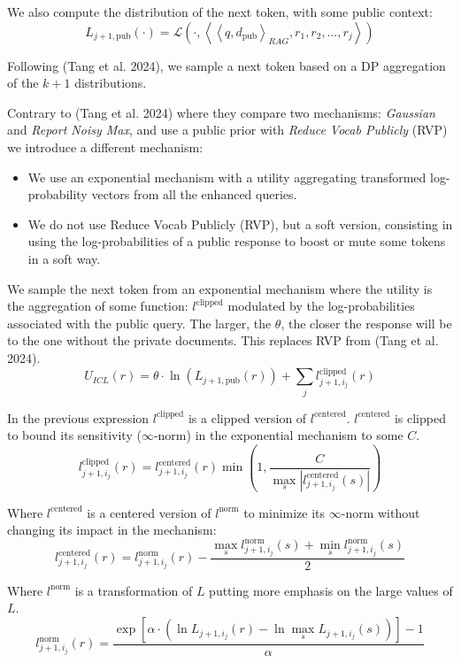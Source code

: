 \documentclass[
  12pt,
  a4paper,
]{article}
\providecommand{\tightlist}{%
  \setlength{\itemsep}{0pt}\setlength{\parskip}{0pt}}
\begin{document}
We also compute the distribution of the next token, with some public
context:
\[L_{j+1, \text{pub}}(\cdot) = \mathcal{L}\left(\cdot, \left<\left<q, d_\text{pub}\right>_{RAG}, r_1, r_2,\ldots, r_j\right>\right)\]

Following (Tang et al. 2024), we sample a next token based on a DP
aggregation of the \(k+1\) distributions.

Contrary to (Tang et al. 2024) where they compare two mechanisms:
\emph{Gaussian} and \emph{Report Noisy Max}, and use a public prior with
\emph{Reduce Vocab Publicly} (RVP) we introduce a different mechanism:

\begin{itemize}
\tightlist
\item
  We use an exponential mechanism with a utility aggregating transformed
  log-probability vectors from all the enhanced queries.
\item
  We do not use Reduce Vocab Publicly (RVP), but a soft version,
  consisting in using the log-probabilities of a public response to
  boost or mute some tokens in a soft way.
\end{itemize}

We sample the next token from an exponential mechanism where the utility
is the aggregation of some function: \(l^\text{clipped}\) modulated by
the log-probabilities associated with the public query. The larger, the
\(\theta\), the closer the response will be to the one without the
private documents. This replaces RVP from (Tang et al. 2024).
\[U_{ICL}(r) = \theta \cdot \ln\left(L_{j+1, \text{pub}}(r)\right) + \sum_j l_{j+1,i_{j}}^\text{clipped}\left(r\right)\]

In the previous expression \(l^\text{clipped}\) is a clipped version of
\(l^\text{centered}\). \(l^\text{centered}\) is clipped to bound its
sensitivity (\(\infty\)-norm) in the exponential mechanism to some
\(C\).
\[l_{j+1,i_{j}}^\text{clipped}\left(r\right) = l_{j+1,i_{j}}^\text{centered}\left(r\right)\min\left(1, \frac{C}{\max_s \left|l_{j+1,i_{j}}^\text{centered}\left(s\right)\right|}\right)\]

Where \(l^\text{centered}\) is a centered version of \(l^\text{norm}\)
to minimize its \(\infty\)-norm without changing its impact in the
mechanism:
\[l_{j+1,i_{j}}^\text{centered}\left(r\right) = l_{j+1,i_{j}}^\text{norm}\left(r\right)-\frac{\max_sl_{j+1,i_{j}}^\text{norm}\left(s\right)+\min_sl_{j+1,i_{j}}^\text{norm}\left(s\right)}{2}\]

Where \(l^\text{norm}\) is a transformation of \(L\) putting more
emphasis on the large values of \(L\).
\[l_{j+1,i_{j}}^\text{norm}\left(r\right) = \frac{\exp\left[\alpha\cdot \left(\ln L_{j+1,i_{j}}\left(r\right) - \ln \max_s L_{j+1,i_{j}}\left(s\right)\right)\right]-1}{\alpha}\]
\end{document}
